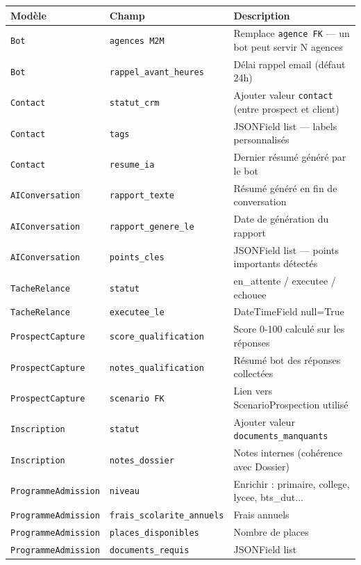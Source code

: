 \documentclass[11pt,a4paper]{article}
\newcommand{\slug}[1]{\texttt{\color{AGTDark}#1}}
\begin{document}
\begin{center}
\begin{tabularx}{\textwidth}{llX}
\toprule
\textbf{Modèle} & \textbf{Champ} & \textbf{Description} \\
\midrule
\slug{Bot} & \slug{agences M2M} & Remplace \slug{agence FK} — un bot peut servir N agences \\
\slug{Bot} & \slug{rappel\_avant\_heures} & Délai rappel email (défaut 24h) \\
\slug{Contact} & \slug{statut\_crm} & Ajouter valeur \texttt{contact} (entre prospect et client) \\
\slug{Contact} & \slug{tags} & JSONField list — labels personnalisés \\
\slug{Contact} & \slug{resume\_ia} & Dernier résumé généré par le bot \\
\slug{AIConversation} & \slug{rapport\_texte} & Résumé généré en fin de conversation \\
\slug{AIConversation} & \slug{rapport\_genere\_le} & Date de génération du rapport \\
\slug{AIConversation} & \slug{points\_cles} & JSONField list — points importants détectés \\
\slug{TacheRelance} & \slug{statut} & en\_attente / executee / echouee \\
\slug{TacheRelance} & \slug{executee\_le} & DateTimeField null=True \\
\slug{ProspectCapture} & \slug{score\_qualification} & Score 0-100 calculé sur les réponses \\
\slug{ProspectCapture} & \slug{notes\_qualification} & Résumé bot des réponses collectées \\
\slug{ProspectCapture} & \slug{scenario FK} & Lien vers ScenarioProspection utilisé \\
\slug{Inscription} & \slug{statut} & Ajouter valeur \texttt{documents\_manquants} \\
\slug{Inscription} & \slug{notes\_dossier} & Notes internes (cohérence avec Dossier) \\
\slug{ProgrammeAdmission} & \slug{niveau} & Enrichir : primaire, college, lycee, bts\_dut... \\
\slug{ProgrammeAdmission} & \slug{frais\_scolarite\_annuels} & Frais annuels \\
\slug{ProgrammeAdmission} & \slug{places\_disponibles} & Nombre de places \\
\slug{ProgrammeAdmission} & \slug{documents\_requis} & JSONField list \\

\end{tabularx}
\end{center}
\end{document}
